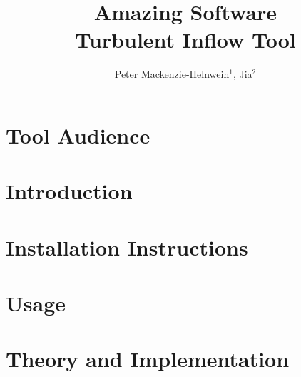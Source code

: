 \documentclass{simcenterdocumentation}
\begin{document}
\title{Amazing Software\\ \Large Turbulent Inflow Tool}
\author{Peter Mackenzie-Helnwein$^{1}$, Jia$^2$}

\hypersetup{pageanchor=false}
\maketitle
\copyrightpage
\acknowledgments

\hypersetup{pageanchor=true}
\begin{frontmatter}

\pagestyle{plain}
{
  \renewcommand{\thispagestyle}[1]{}
  \tableofcontents
  \clearpage
  \listoffigures
  \clearpage
  \listoftables
}

\end{frontmatter}
\pagestyle{somewhatsimple}

\chapter{Tool Audience}


\chapter{Introduction}


\chapter{Installation Instructions}

\chapter{Usage}

\chapter{Theory and Implementation}
\end{document}
